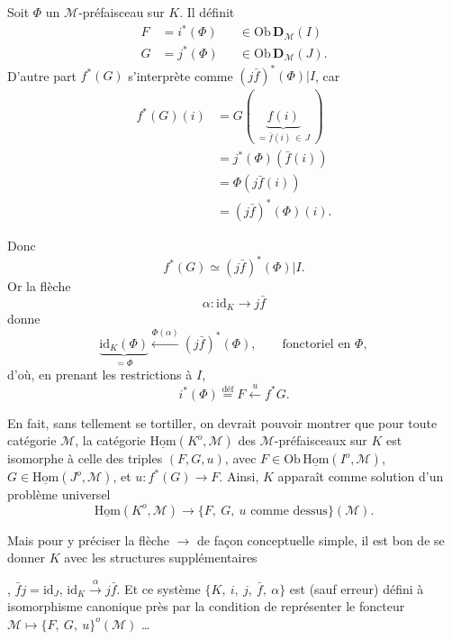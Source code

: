 \documentclass[11pt]{article}
\newcommand{\printedpage}[1]{\marginpar{\footnotesize p.~#1}}
\newcommand{\msp}[1]{\marginpar{\footnotesize [#1]}}
\newcommand{\uHom}{\underline{\mathrm{Hom}}}
\newcommand{\Ob}{\mathrm{Ob}\,}
\newcommand{\id}{\mathrm{id}}
\begin{document}
Soit $\Phi$ un $\mathcal{M}$-préfaisceau sur $K$. Il définit
\[
\begin{aligned}
F &= i^*(\Phi) && \in \Ob \mathbf{D}_{\mathcal{M}}(I)\\
G &= j^*(\Phi) && \in \Ob \mathbf{D}_{\mathcal{M}}(J).
\end{aligned}
\]
D'autre part $f^*(G)$ s'interprète comme $(j\bar{f})^*(\Phi)|I$, car
\[
\begin{aligned}
f^*(G)(i) &= G(\ \underbrace{f(i)}_{= \bar{f}(i) \,\in\, J}\ )\\
&= j^*(\Phi)(\bar{f}(i))\\
&= \Phi(j\bar{f}(i))\\
&= (j\bar{f})^*(\Phi)(i).
\end{aligned}
\]

\msp{page 81}
Donc
\[ f^*(G) \simeq (j\bar{f})^*(\Phi)|I. \]
Or la flèche
\[ \alpha : \id_K \longrightarrow j\bar{f} \]
donne
\[ \underbrace{\id_K(\Phi)}_{= \Phi} \xleftarrow{\Phi(\alpha)} (j\bar{f})^*(\Phi), \qquad \text{fonctoriel en } \Phi, \]
d'où, en prenant les restrictions à $I$,
\[ i^*(\Phi) \overset{\text{déf}}{=} F \xleftarrow{\ u\ } f^*G. \]

En fait, sans tellement se tortiller, on devrait pouvoir montrer que pour toute catégorie $\mathcal{M}$, la catégorie $\uHom(K^o, \mathcal{M})$ des $\mathcal{M}$-préfaisceaux sur $K$ est isomorphe à celle des triples $(F,G,u)$, avec $F \in \Ob \uHom(I^o, \mathcal{M})$, $G \in \uHom(J^o, \mathcal{M})$, et $u : f^*(G) \longrightarrow F$. Ainsi, $K$ apparaît comme solution d'un problème universel
\[ \uHom(K^o, \mathcal{M}) \longrightarrow \{F,\ G,\ u \text{ comme dessus}\}(\mathcal{M}). \]

Mais pour y préciser la flèche $\longrightarrow$ de façon conceptuelle simple, il est bon de se donner $K$ avec les structures supplémentaires , $\bar{f}j = \id_J$, $\id_K \xrightarrow{\alpha} j\bar{f}$. Et ce système %
\printedpage{7}
\msp{page 82}
$\{K,\ i,\ j,\ \bar{f},\ \alpha\}$ est (sauf erreur) défini à isomorphisme canonique près par la condition de représenter le foncteur $\mathcal{M} \longmapsto \{F,\ G,\ u\}^o(\mathcal{M})$ \dots
\end{document}
